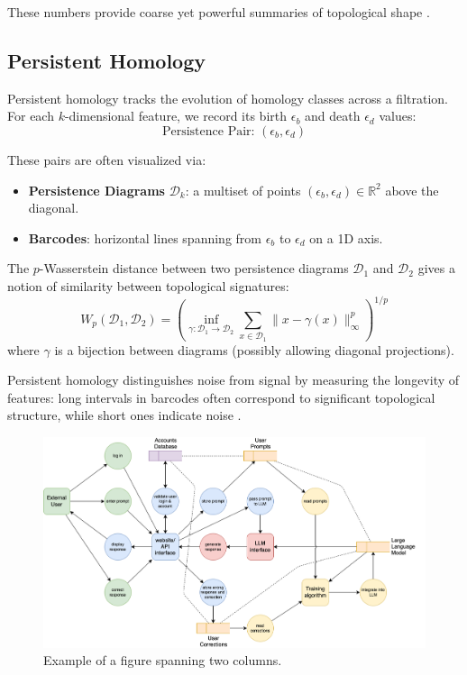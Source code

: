 \documentclass[9pt, twoside, twocolumn]{extarticle}
\begin{document}
        These numbers provide coarse yet powerful summaries of topological shape \cite{hatcher2002algebraic}.


    \subsection*{Persistent Homology}

        Persistent homology tracks the evolution of homology classes across a filtration. For each $k$-dimensional feature, we record its birth $\epsilon_b$ and death $\epsilon_d$ values:
        \[
        \text{Persistence Pair: } (\epsilon_b, \epsilon_d)
        \]

        These pairs are often visualized via:
        \begin{itemize}
            \item \textbf{Persistence Diagrams} $\mathcal{D}_k$: a multiset of points $(\epsilon_b, \epsilon_d) \in \mathbb{R}^2$ above the diagonal.
            \item \textbf{Barcodes}: horizontal lines spanning from $\epsilon_b$ to $\epsilon_d$ on a 1D axis.
        \end{itemize}

        The $p$-Wasserstein distance between two persistence diagrams $\mathcal{D}_1$ and $\mathcal{D}_2$ gives a notion of similarity between topological signatures:
        \[
        W_p(\mathcal{D}_1, \mathcal{D}_2) = \left( \inf_{\gamma: \mathcal{D}_1 \to \mathcal{D}_2} \sum_{x \in \mathcal{D}_1} \|x - \gamma(x)\|^p_\infty \right)^{1/p}
        \]
        where $\gamma$ is a bijection between diagrams (possibly allowing diagonal projections).

        Persistent homology distinguishes noise from signal by measuring the longevity of features: long intervals in barcodes often correspond to significant topological structure, while short ones indicate noise \cite{edelsbrunner2000topological, chazal2021introduction}.

        \begin{figure}
            \centering
            \includegraphics[width=\textwidth]{diagram-2.png}
            \caption{Example of a figure spanning two columns.}
            \label{fig:example-full}
        \end{figure}
\end{document}
